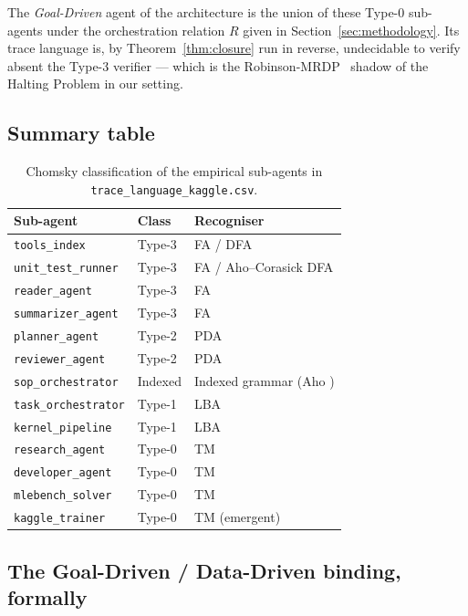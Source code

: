 The \emph{Goal-Driven} agent of the architecture is the union of
these Type-0 sub-agents under the orchestration relation $R$ given
in Section~\ref{sec:methodology}.  Its trace language is, by
Theorem~\ref{thm:closure} run in reverse, undecidable to verify
absent the Type-3 verifier --- which is the
Robinson-MRDP~\cite{robinson1949definability,davis1961decision}
shadow of the Halting Problem in our setting.

\subsection{Summary table}

\begin{table}[ht]
\centering
\caption{Chomsky classification of the empirical sub-agents in
\texttt{trace\_language\_kaggle.csv}.}
\label{tab:chomsky-empirical}
\begin{tabular}{l|l|l}
\hline
\textbf{Sub-agent} & \textbf{Class} & \textbf{Recogniser} \\ \hline
\texttt{tools\_index}        & Type-3 & FA / DFA \\
\texttt{unit\_test\_runner}  & Type-3 & FA / Aho--Corasick DFA \\
\texttt{reader\_agent}       & Type-3 & FA \\
\texttt{summarizer\_agent}   & Type-3 & FA \\ \hline
\texttt{planner\_agent}      & Type-2 & PDA \\
\texttt{reviewer\_agent}     & Type-2 & PDA \\ \hline
\texttt{sop\_orchestrator}   & Indexed & Indexed grammar
                                          (Aho \cite{aho1968indexed}) \\ \hline
\texttt{task\_orchestrator}  & Type-1 & LBA \\
\texttt{kernel\_pipeline}    & Type-1 & LBA \\ \hline
\texttt{research\_agent}     & Type-0 & TM \\
\texttt{developer\_agent}    & Type-0 & TM \\
\texttt{mlebench\_solver}    & Type-0 & TM \\
\texttt{kaggle\_trainer}     & Type-0 & TM (emergent) \\ \hline
\end{tabular}
\end{table}

\subsection{The Goal-Driven / Data-Driven binding, formally}

